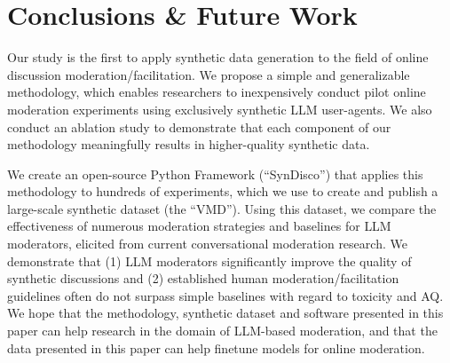 %
\section{Conclusions \& Future Work}

Our study is the first to apply synthetic data generation to the field of online discussion moderation/facilitation. We propose a simple and generalizable methodology, which enables researchers to inexpensively conduct pilot online moderation experiments using exclusively synthetic \ac{LLM} user-agents. We also conduct an ablation study to demonstrate that each component of our methodology meaningfully results in higher-quality synthetic data.

We create an open-source Python Framework (“SynDisco”) that applies this methodology to hundreds of experiments, which we use to create and publish a large-scale synthetic dataset (the “\acf{VMD}”). Using this dataset, we compare the effectiveness of numerous moderation strategies and baselines  for \ac{LLM} moderators, elicited from current conversational moderation research. We demonstrate that (1) \ac{LLM} moderators significantly improve the quality of synthetic discussions and (2) established human moderation/facilitation guidelines often do not surpass simple baselines with regard to toxicity and \ac{AQ}. We hope that the methodology, synthetic dataset and software presented in this paper can help research in the domain of \ac{LLM}-based moderation, and that the data presented in this paper can help finetune models for online moderation.
